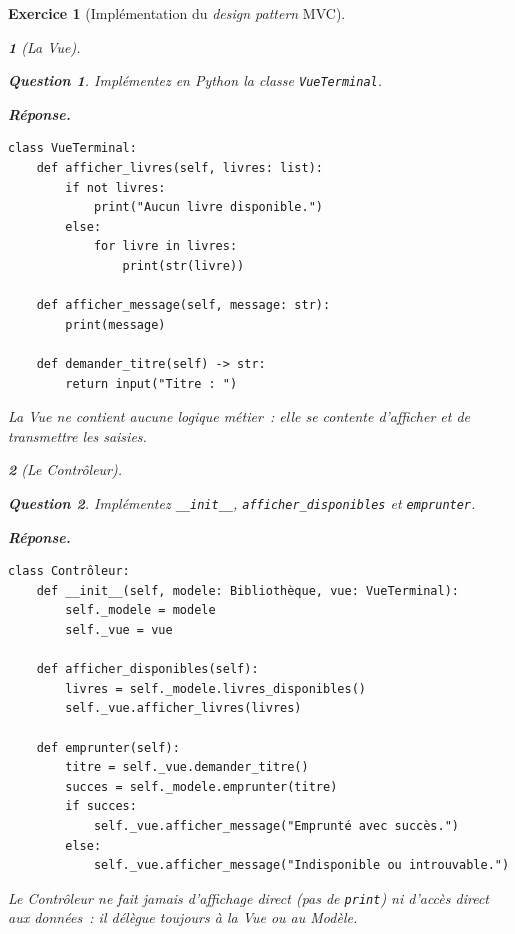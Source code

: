 \documentclass{article}
\theoremstyle{exostyle}
\newtheorem{exo}{Exercice}
\theoremstyle{partiestyle}
\newtheorem{partie}{}[exo]
\theoremstyle{questionstyle}
\newtheorem{questionpartie}{Question}[partie]
\newenvironment{reponse}{%
    \par\smallskip\noindent\textbf{Réponse.}\enspace\ignorespaces
}{%
    \par\smallskip
}
\begin{document}
\begin{exo}[Implémentation du \textit{design pattern} MVC]

    \begin{partie}[La Vue]

        \begin{questionpartie}
            Implémentez en Python la classe \texttt{VueTerminal}.
        \end{questionpartie}
        \begin{reponse}
\begin{lstlisting}
class VueTerminal:
    def afficher_livres(self, livres: list):
        if not livres:
            print("Aucun livre disponible.")
        else:
            for livre in livres:
                print(str(livre))

    def afficher_message(self, message: str):
        print(message)

    def demander_titre(self) -> str:
        return input("Titre : ")
\end{lstlisting}
            La Vue ne contient aucune logique métier~: elle se contente d'afficher et de transmettre les saisies.
        \end{reponse}

    \end{partie}

    \begin{partie}[Le Contrôleur]

        \begin{questionpartie}
            Implémentez \texttt{\_\_init\_\_}, \texttt{afficher\_disponibles} et \texttt{emprunter}.
        \end{questionpartie}
        \begin{reponse}
\begin{lstlisting}
class Contrôleur:
    def __init__(self, modele: Bibliothèque, vue: VueTerminal):
        self._modele = modele
        self._vue = vue

    def afficher_disponibles(self):
        livres = self._modele.livres_disponibles()
        self._vue.afficher_livres(livres)

    def emprunter(self):
        titre = self._vue.demander_titre()
        succes = self._modele.emprunter(titre)
        if succes:
            self._vue.afficher_message("Emprunté avec succès.")
        else:
            self._vue.afficher_message("Indisponible ou introuvable.")
\end{lstlisting}
            Le Contrôleur ne fait jamais d'affichage direct (pas de \texttt{print}) ni d'accès direct aux données~: il délègue toujours à la Vue ou au Modèle.
        \end{reponse}


\end{partie}
\end{exo}
\end{document}
